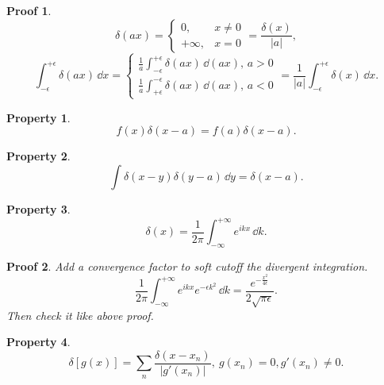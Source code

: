 \documentclass{article}
\theoremstyle{1}
\newtheorem{property}{Property}
\theoremstyle{2}
\newtheorem*{proof_env}{Proof}
\begin{document}
\begin{proof_env}
    \begin{equation}
        \delta(ax)=\left\{\begin{matrix}
           0,&x\not=0\\
            +\infty,&x=0 
        \end{matrix}\right. =\frac{\delta(x)}{\left|a\right|},
    \end{equation}
    \begin{equation}
       \int_{-\epsilon}^{+\epsilon}\delta(ax)\, \dd x=\left\{\begin{matrix}
        \frac{1}{a}\int_{-\epsilon}^{+\epsilon}\delta(ax)\, \dd (ax),\, a>0\\
        \frac{1}{a}\int_{+\epsilon}^{-\epsilon}\delta(ax)\, \dd (ax),\, a<0
       \end{matrix}\right. =\frac{1}{\left|a\right|}\int_{-\epsilon}^{+\epsilon}\delta(x)\, \dd x .
    \end{equation}
\end{proof_env}
\begin{property}
    \begin{equation}
        f(x)\delta(x-a)=f(a)\delta(x-a).
    \end{equation}
\end{property}
\begin{property}
    \begin{equation}
        \int\delta(x-y)\delta(y-a)\, \dd y=\delta(x-a).
    \end{equation}   
\end{property}
\begin{property}
    \begin{equation}
        \delta(x)=\frac{1}{2\pi}\int_{-\infty}^{+\infty}e^{ikx}\, \dd k.
    \end{equation}    
\end{property}
\begin{proof_env}
    Add a convergence factor to soft cutoff the divergent integration.
    \begin{equation}
       \frac{1}{2\pi} \int_{-\infty}^{+\infty}e^{ikx}e^{-\epsilon k^2}\, \dd k=\frac{e^{-\frac{x^2}{4\epsilon}}}{2\sqrt{\pi\epsilon}}.
    \end{equation}
    Then check it like above proof.
\end{proof_env}
\begin{property}
    \begin{equation}
        \delta[g(x)]=\sum_{n}\frac{\delta(x-x_n)}{\left|g'(x_n)\right|},\ g(x_n)=0,g'(x_n)\not=0.
    \end{equation}
\end{property}
\end{document}
